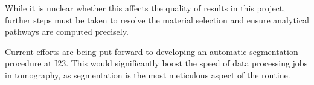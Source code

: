 While it is unclear whether this affects the quality of results in this project, further steps must be taken to resolve the material selection and ensure analytical pathways are computed precisely.

Current efforts are being put forward to developing an automatic segmentation procedure at I23. This would significantly boost the speed of data processing jobs in tomography, as segmentation is the most meticulous aspect of the routine.




